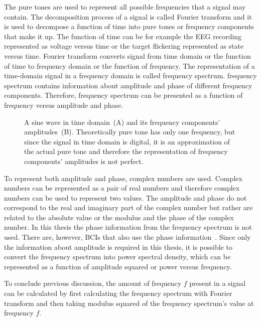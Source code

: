 The \glspl{pure tone} are used to represent all possible frequencies that a signal may contain. The decomposition process of a signal is called \gls{Fourier transform} and it is used to decompose a function of time into \glspl{pure tone} or \glspl{frequency component} that make it up. The function of time can be for example the \gls{EEG} recording represented as voltage versus time or the \gls{target} \gls{flickering} represented as \gls{state} versus time. \Gls{Fourier transform} converts signal from time domain or the function of time to frequency domain or the function of frequency. The representation of a time-domain signal in a frequency domain is called \gls{frequency spectrum}. \Gls{frequency spectrum} contains information about amplitude and phase of different \glspl{frequency component}. Therefore, \gls{frequency spectrum} can be presented as a function of frequency versus amplitude and phase.

\begin{figure}[h]
	
	\caption{A sine wave in time domain~(A) and its frequency components' amplitudes~(B). Theoretically pure tone has only one frequency, but since the signal in time domain is digital, it is an approximation of the actual pure tone and therefore the representation of frequency components' amplitudes is not perfect.}
	\label{fig:pure_tone}
\end{figure}

To represent both amplitude and phase, complex numbers are used. Complex numbers can be represented as a pair of real numbers and therefore complex numbers can be used to represent two values. The amplitude and phase do not correspond to the real and imaginary part of the complex number but rather are related to the absolute value or the modulus and the phase of the complex number. In this thesis the phase information from the \gls{frequency spectrum} is not used. There are, however, \glspl{BCI} that also use the phase information~\cite{MPCC}. Since only the information about amplitude is required in this thesis, it is possible to convert the \gls{frequency spectrum} into \gls{power spectral density}, which can be represented as a function of amplitude squared or power versus frequency.

To conclude previous discussion, the amount of frequency $f$ present in a signal can be calculated by first calculating the \gls{frequency spectrum} with \gls{Fourier transform} and then taking modulus squared of the \gls{frequency spectrum}'s value at frequency $f$.

